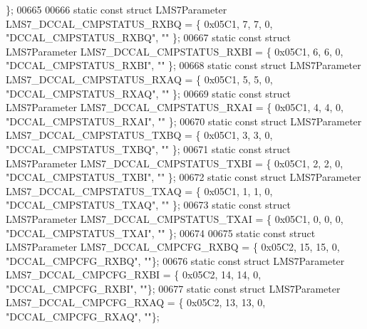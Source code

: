 \begin{DoxyCode}
      \};
00665 
00666 \textcolor{keyword}{static} \textcolor{keyword}{const} \textcolor{keyword}{struct }LMS7Parameter LMS7_DCCAL_CMPSTATUS_RXBQ = \{ 0x05C1, 7, 7, 0, \textcolor{stringliteral}{"DCCAL\_CMPSTATUS\_RXBQ"}, \textcolor{stringliteral}{""}
      \};
00667 \textcolor{keyword}{static} \textcolor{keyword}{const} \textcolor{keyword}{struct }LMS7Parameter LMS7_DCCAL_CMPSTATUS_RXBI = \{ 0x05C1, 6, 6, 0, \textcolor{stringliteral}{"DCCAL\_CMPSTATUS\_RXBI"}, \textcolor{stringliteral}{""}
      \};
00668 \textcolor{keyword}{static} \textcolor{keyword}{const} \textcolor{keyword}{struct }LMS7Parameter LMS7_DCCAL_CMPSTATUS_RXAQ = \{ 0x05C1, 5, 5, 0, \textcolor{stringliteral}{"DCCAL\_CMPSTATUS\_RXAQ"}, \textcolor{stringliteral}{""}
      \};
00669 \textcolor{keyword}{static} \textcolor{keyword}{const} \textcolor{keyword}{struct }LMS7Parameter LMS7_DCCAL_CMPSTATUS_RXAI = \{ 0x05C1, 4, 4, 0, \textcolor{stringliteral}{"DCCAL\_CMPSTATUS\_RXAI"}, \textcolor{stringliteral}{""}
      \};
00670 \textcolor{keyword}{static} \textcolor{keyword}{const} \textcolor{keyword}{struct }LMS7Parameter LMS7_DCCAL_CMPSTATUS_TXBQ = \{ 0x05C1, 3, 3, 0, \textcolor{stringliteral}{"DCCAL\_CMPSTATUS\_TXBQ"}, \textcolor{stringliteral}{""}
      \};
00671 \textcolor{keyword}{static} \textcolor{keyword}{const} \textcolor{keyword}{struct }LMS7Parameter LMS7_DCCAL_CMPSTATUS_TXBI = \{ 0x05C1, 2, 2, 0, \textcolor{stringliteral}{"DCCAL\_CMPSTATUS\_TXBI"}, \textcolor{stringliteral}{""}
      \};
00672 \textcolor{keyword}{static} \textcolor{keyword}{const} \textcolor{keyword}{struct }LMS7Parameter LMS7_DCCAL_CMPSTATUS_TXAQ = \{ 0x05C1, 1, 1, 0, \textcolor{stringliteral}{"DCCAL\_CMPSTATUS\_TXAQ"}, \textcolor{stringliteral}{""}
      \};
00673 \textcolor{keyword}{static} \textcolor{keyword}{const} \textcolor{keyword}{struct }LMS7Parameter LMS7_DCCAL_CMPSTATUS_TXAI = \{ 0x05C1, 0, 0, 0, \textcolor{stringliteral}{"DCCAL\_CMPSTATUS\_TXAI"}, \textcolor{stringliteral}{""}
      \};
00674 
00675 \textcolor{keyword}{static} \textcolor{keyword}{const} \textcolor{keyword}{struct }LMS7Parameter LMS7_DCCAL_CMPCFG_RXBQ = \{ 0x05C2, 15, 15, 0, \textcolor{stringliteral}{"DCCAL\_CMPCFG\_RXBQ"}, \textcolor{stringliteral}{""}\};
00676 \textcolor{keyword}{static} \textcolor{keyword}{const} \textcolor{keyword}{struct }LMS7Parameter LMS7_DCCAL_CMPCFG_RXBI = \{ 0x05C2, 14, 14, 0, \textcolor{stringliteral}{"DCCAL\_CMPCFG\_RXBI"}, \textcolor{stringliteral}{""}\};
00677 \textcolor{keyword}{static} \textcolor{keyword}{const} \textcolor{keyword}{struct }LMS7Parameter LMS7_DCCAL_CMPCFG_RXAQ = \{ 0x05C2, 13, 13, 0, \textcolor{stringliteral}{"DCCAL\_CMPCFG\_RXAQ"}, \textcolor{stringliteral}{""}\};

\end{DoxyCode}

